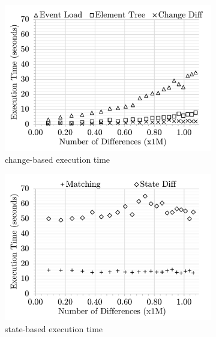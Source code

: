 \documentclass{jot}
\begin{document}
\begin{figure}[ht]
    \centering
    \begin{subfigure}[t]{0.495\linewidth}
        \includegraphics[width=\linewidth]{Time-ChangeDiff-Detail}
        \caption{change-based execution time}
        \label{fig:time_changediff_detail}
    \end{subfigure}
    \hfill
    \begin{subfigure}[t]{0.495\linewidth}
        \includegraphics[width=\linewidth]{Time-StateDiff-Detail}
        \caption{state-based execution time}
        \label{fig:time_statediff_detail}
    \end{subfigure}
    \begin{subfigure}[t]{0.495\linewidth}

\end{subfigure}
\end{figure}
\end{document}
